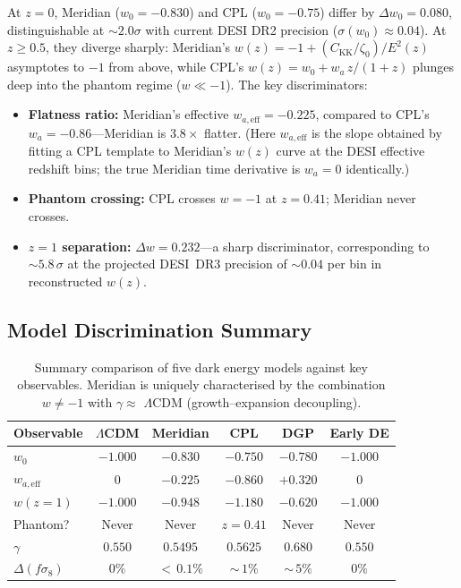 At $z = 0$, Meridian ($w_0 = -0.830$) and CPL ($w_0 = -0.75$) differ by $\Delta w_0 = 0.080$, distinguishable at ${\sim}2.0\sigma$ with current DESI DR2 precision ($\sigma(w_0) \approx 0.04$). At $z \geq 0.5$, they diverge sharply: Meridian's $w(z) = -1 + (C_\mathrm{KK}/\zeta_0)/E^2(z)$ asymptotes to $-1$ from above, while CPL's $w(z) = w_0 + w_a\,z/(1+z)$ plunges deep into the phantom regime ($w \ll -1$). The key discriminators:
\begin{itemize}
\item \textbf{Flatness ratio:} Meridian's effective $w_{a,\mathrm{eff}} = -0.225$, compared to CPL's $w_a = -0.86$---Meridian is $3.8\times$ flatter. (Here $w_{a,\mathrm{eff}}$ is the slope obtained by fitting a CPL template to Meridian's $w(z)$ curve at the DESI effective redshift bins; the true Meridian time derivative is $w_a = 0$ identically.)
\item \textbf{Phantom crossing:} CPL crosses $w = -1$ at $z = 0.41$; Meridian never crosses.
\item \textbf{$z = 1$ separation:} $\Delta w = 0.232$---a sharp discriminator, corresponding to $\sim\!5.8\,\sigma$ at the projected DESI~DR3 precision of $\sim\!0.04$ per bin in reconstructed $w(z)$.
\end{itemize}

\subsection{Model Discrimination Summary}
\label{sec:2-model-discrimination}

\begin{table}[htbp]
\centering
\caption{Summary comparison of five dark energy models against key observables. Meridian is uniquely characterised by the combination $w \neq -1$ with $\gamma \approx$ $\Lambda$CDM (growth--expansion decoupling).}
\label{tab:2-model-summary}
\small
\begin{tabular}{@{}lccccc@{}}
\toprule
Observable & $\Lambda$CDM & Meridian & CPL & DGP & Early DE \\
\midrule
$w_0$ & $-1.000$ & $-0.830$ & $-0.750$ & $-0.780$ & $-1.000$ \\
$w_{a,\mathrm{eff}}$ & $0$ & $-0.225$ & $-0.860$ & $+0.320$ & $0$ \\
$w(z{=}1)$ & $-1.000$ & $-0.948$ & $-1.180$ & $-0.620$ & $-1.000$ \\
Phantom? & Never & Never & $z = 0.41$ & Never & Never \\
$\gamma$ & $0.550$ & $0.5495$ & $0.5625$ & $0.680$ & $0.550$ \\
$\Delta(f\sigma_8)$ & $0\%$ & ${<}\,0.1\%$ & ${\sim}\,1\%$ & ${\sim}\,5\%$ & $0\%$ \\
\bottomrule
\end{tabular}
\end{table}

